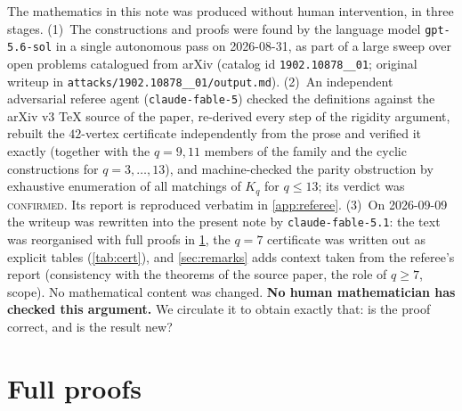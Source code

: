 \documentclass[11pt,a4paper]{article}
\theoremstyle{plain}
\theoremstyle{definition}
\theoremstyle{remark}
\begin{document}
The mathematics in this note was produced without human intervention, in three stages.
(1)~The constructions and proofs were found by the language model \texttt{gpt-5.6-sol} in a single autonomous pass on 2026-08-31, as part of a large sweep over open problems catalogued from arXiv (catalog id \texttt{1902.10878\_\_01}; original writeup in \texttt{attacks/1902.10878\_\_01/output.md}).
(2)~An independent adversarial referee agent (\texttt{claude-fable-5}) checked the definitions against the arXiv v3 TeX source of the paper, re-derived every step of the rigidity argument, rebuilt the $42$-vertex certificate independently from the prose and verified it exactly (together with the $q=9,11$ members of the family and the cyclic constructions for $q=3,\dots,13$), and machine-checked the parity obstruction by exhaustive enumeration of all matchings of $K_q$ for $q\le13$; its verdict was \textsc{confirmed}. Its report is reproduced verbatim in \cref{app:referee}.
(3)~On 2026-09-09 the writeup was rewritten into the present note by \texttt{claude-fable-5.1}: the text was reorganised with full proofs in \cref{app:proofs}, the $q=7$ certificate was written out as explicit tables (\cref{tab:cert}), and \cref{sec:remarks} adds context taken from the referee's report (consistency with the theorems of the source paper, the role of $q\ge7$, scope). No mathematical content was changed.
\textbf{No human mathematician has checked this argument.} We circulate it to obtain exactly that: is the proof correct, and is the result new?


\appendix

\section{Full proofs}\label{app:proofs}
\end{document}
